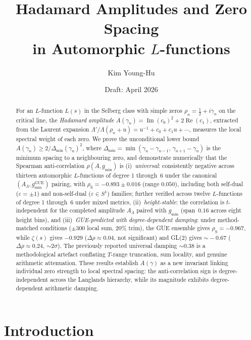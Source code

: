\documentclass[11pt,a4paper]{article}
\title{Hadamard Amplitudes and Zero Spacing\\
in Automorphic $L$-functions}
\author{Kim Young-Hu}
\date{Draft: April 2026}
\theoremstyle{plain}
\theoremstyle{definition}
\DeclareMathOperator{\GUE}{GUE}
\newcommand{\La}{\Lambda}
\begin{document}
\maketitle

\begin{abstract}
For an $L$-function $L(s)$ in the Selberg class with simple zeros
$\rho_n = \tfrac{1}{2} + i\gamma_n$ on the critical line,
the \emph{Hadamard amplitude}
$A(\gamma_n) = \operatorname{Im}(c_0)^2 + 2\operatorname{Re}(c_1)$,
extracted from the Laurent expansion
$\La'/\La(\rho_n + u) = u^{-1} + c_0 + c_1 u + \cdots$,
measures the local spectral weight of each zero.
We prove the unconditional lower bound
$A(\gamma_n) \ge 2/\Delta_{\min}(\gamma_n)^2$,
where $\Delta_{\min} = \min(\gamma_n - \gamma_{n-1},\,\gamma_{n+1} - \gamma_n)$
is the minimum spacing to a neighbouring zero, and demonstrate
numerically that the Spearman anti-correlation $\rho(A, g_{\min})$ is
(i)~\emph{universal}: consistently negative across thirteen automorphic
$L$-functions of degree 1 through~6 under the canonical
$(A_\La, g_{\min}^{\GUE})$ pairing, with
$\rho_{\mathrm{S}} = -0.893 \pm 0.016$ (range $0.050$),
including both self-dual ($\varepsilon = \pm 1$) and
non-self-dual ($\varepsilon \in S^1$) families;
further verified across twelve $L$-functions of degree 1 through~6
under mixed metrics,
(ii)~\emph{height-stable}: the correlation is
$t$-independent for the completed amplitude $A_\La$ paired with
$g_{\min}$ (span~$0.16$ across eight height bins), and
(iii)~\emph{GUE-predicted with degree-dependent damping}:
under method-matched conditions ($\pm 300$ local sum,
$20\%$ trim), the GUE ensemble gives
$\rho_{\mathrm{S}} = -0.967$, while $\zeta(s)$ gives $-0.929$
($\Delta\rho \approx 0.04$, not significant) and GL(2) gives
$\sim\!-0.67$ ($\Delta\rho \approx 0.24$, ${\sim}2\sigma$).
The previously reported universal damping ${\sim}0.38$ is a
methodological artefact conflating $T$-range truncation,
sum locality, and genuine arithmetic attenuation.
These results establish $A(\gamma)$ as a new invariant linking
individual zero strength to local spectral spacing:
the anti-correlation sign is degree-independent across the
Langlands hierarchy, while its magnitude exhibits
degree-dependent arithmetic damping.
\end{abstract}


\section{Introduction}
\label{sec:intro}
\end{document}
